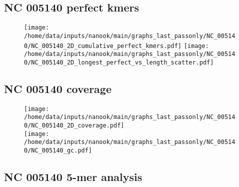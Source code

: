 \documentclass[a4paper,11pt,oneside]{article}
\begin{document}
\subsection*{NC 005140 perfect kmers}
\vspace{-3mm}
\begin{figure}[H]
\centering
  \texttt{[image: /home/data/inputs/nanook/main/graphs\_last\_passonly/NC\_005140/NC\_005140\_2D\_cumulative\_perfect\_kmers.pdf]}
     \texttt{[image: /home/data/inputs/nanook/main/graphs\_last\_passonly/NC\_005140/NC\_005140\_2D\_longest\_perfect\_vs\_length\_scatter.pdf]}
\end{figure}
\subsection*{NC 005140 coverage}
\vspace{-3mm}
\begin{figure}[H]
\centering
  \texttt{[image: /home/data/inputs/nanook/main/graphs\_last\_passonly/NC\_005140/NC\_005140\_2D\_coverage.pdf]} \\
\texttt{[image: /home/data/inputs/nanook/main/graphs\_last\_passonly/NC\_005140/NC\_005140\_gc.pdf]}
\end{figure}
\subsection*{NC 005140 5-mer analysis}
\end{document}
